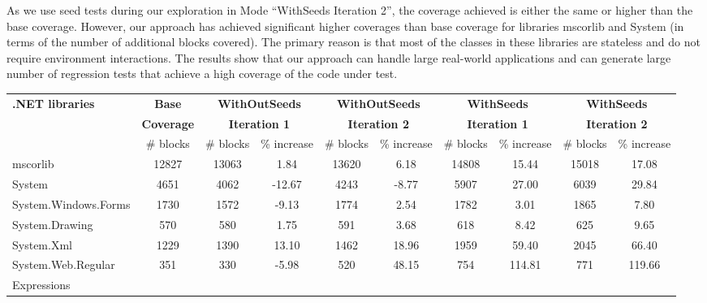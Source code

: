 As we use seed tests during our exploration in Mode ``WithSeeds Iteration 2'', the coverage achieved is either the same or higher than the base coverage. However, our approach has achieved significant higher coverages than base coverage for libraries mscorlib and System (in terms of the number of additional blocks covered). The primary reason is that most of the classes in these libraries are stateless and do not require environment interactions. The results show that our approach can handle large real-world applications and can generate large number of regression tests that achieve a high coverage of the code under test.

\setlength{\tabcolsep}{1pt}
\begin{table}[t]
\begin{SmallOut}
\begin{CodeOut}
\begin{center}
\begin {tabular} {|l|c|c|c|c|c|c|c|c|c|}
\hline
\textbf{.NET libraries} & \textbf{Base} & \multicolumn{2}{|c|}{\textbf{WithOutSeeds}} & \multicolumn{2}{|c|}{\textbf{WithOutSeeds}} & \multicolumn{2}{|c|}{\textbf{WithSeeds}} & \multicolumn{2}{|c|}{\textbf{WithSeeds}}\\ 
 & \textbf{Coverage} & \multicolumn{2}{|c|}{\textbf{Iteration 1}} & \multicolumn{2}{|c|}{\textbf{Iteration 2}} & \multicolumn{2}{|c|}{\textbf{Iteration 1}} & \multicolumn{2}{|c|}{\textbf{Iteration 2}}\\ 
\cline{3-10}
 & \# blocks & \# blocks & \% increase & \# blocks & \% increase & \# blocks & \% increase & \# blocks & \% increase\\ 
\hline  mscorlib   						& 12827 	& 13063 & 1.84		& 13620 & 6.18	& 14808	& 15.44		& 15018	& 17.08					\\
\hline  System    						& 4651  	& 4062  & -12.67	& 4243	& -8.77	& 5907	& 27.00		& 6039	& 29.84 				\\
\hline  System.Windows.Forms  & 1730 		& 1572  & -9.13		& 1774	& 2.54	& 1782	& 3.01		& 1865	& 7.80 					\\
\hline  System.Drawing 				& 570			& 580		& 1.75		& 591		& 3.68	& 618		& 8.42		& 625		& 9.65 					\\
\hline  System.Xml 						& 1229    & 1390	& 13.10		& 1462	& 18.96	& 1959	& 59.40		& 2045	& 66.40 				\\
\hline  System.Web.Regular 		& 351     & 330		& -5.98		& 520		& 48.15	& 754		& 114.81 	& 771		& 119.66 				\\
			  Expressions 					& 				& 			& 				& 			& 			& 			& 				& 			&  							\\

\end{tabular}
\end{center}
\end{CodeOut}
\end{SmallOut}
\end{table}
